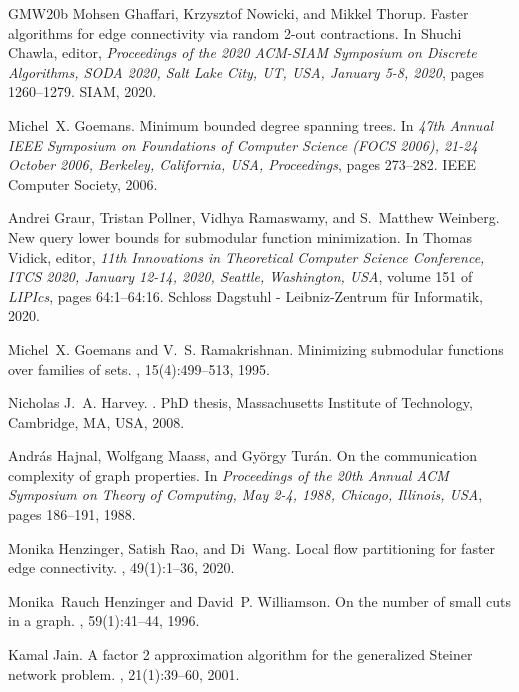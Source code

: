 \documentclass[10pt,a4paper]{article}
\newcommand{\1}{\mathbf{1}}
\theoremstyle{definition}
\begin{document}
\begin{thebibliography}{GMW20b}
Mohsen Ghaffari, Krzysztof Nowicki, and Mikkel Thorup.
\newblock Faster algorithms for edge connectivity via random 2-out
  contractions.
\newblock In Shuchi Chawla, editor, {\em Proceedings of the 2020 {ACM-SIAM}
  Symposium on Discrete Algorithms, {SODA} 2020, Salt Lake City, UT, USA,
  January 5-8, 2020}, pages 1260--1279. {SIAM}, 2020.

Michel~X. Goemans.
\newblock Minimum bounded degree spanning trees.
\newblock In {\em 47th Annual {IEEE} Symposium on Foundations of Computer
  Science {(FOCS} 2006), 21-24 October 2006, Berkeley, California, USA,
  Proceedings}, pages 273--282. {IEEE} Computer Society, 2006.

Andrei Graur, Tristan Pollner, Vidhya Ramaswamy, and S.~Matthew Weinberg.
\newblock New query lower bounds for submodular function minimization.
\newblock In Thomas Vidick, editor, {\em 11th Innovations in Theoretical
  Computer Science Conference, {ITCS} 2020, January 12-14, 2020, Seattle,
  Washington, {USA}}, volume 151 of {\em LIPIcs}, pages 64:1--64:16. Schloss
  Dagstuhl - Leibniz-Zentrum f{\"{u}}r Informatik, 2020.

Michel~X. Goemans and V.~S. Ramakrishnan.
\newblock Minimizing submodular functions over families of sets.
, 15(4):499--513, 1995.

Nicholas J.~A. Harvey.
.
\newblock PhD thesis, Massachusetts Institute of Technology, Cambridge, MA,
  {USA}, 2008.

Andr{\'{a}}s Hajnal, Wolfgang Maass, and Gy{\"{o}}rgy Tur{\'{a}}n.
\newblock On the communication complexity of graph properties.
\newblock In {\em Proceedings of the 20th Annual {ACM} Symposium on Theory of
  Computing, May 2-4, 1988, Chicago, Illinois, {USA}}, pages 186--191, 1988.

Monika Henzinger, Satish Rao, and Di~Wang.
\newblock Local flow partitioning for faster edge connectivity.
, 49(1):1--36, 2020.

Monika~Rauch Henzinger and David~P. Williamson.
\newblock On the number of small cuts in a graph.
, 59(1):41--44, 1996.

Kamal Jain.
\newblock A factor 2 approximation algorithm for the generalized {S}teiner
  network problem.
, 21(1):39--60, 2001.


\end{thebibliography}
\end{document}
